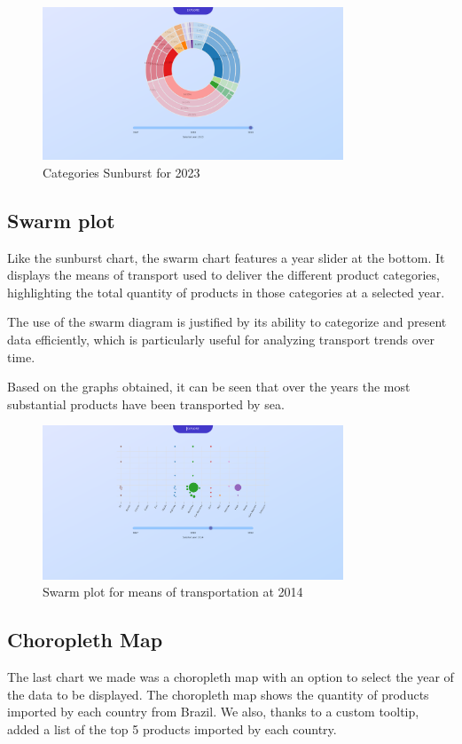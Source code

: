 \documentclass[12pt,a4]{article}
\begin{document}
\begin{figure}[H]
    \centering
    \includegraphics[width=0.8\textwidth]{sunburst.png}
    \caption{Categories Sunburst for 2023}
\end{figure}

\subsection{Swarm plot}
Like the sunburst chart, the swarm chart features a year slider at the bottom. It displays the means of transport used to deliver the different product categories, highlighting the total quantity of products in those categories at a selected year.

The use of the swarm diagram is justified by its ability to categorize and present data efficiently, which is particularly useful for analyzing transport trends over time.

Based on the graphs obtained, it can be seen that over the years the most substantial products have been transported by sea.

\begin{figure}[H]
    \centering
    \includegraphics[width=0.8\textwidth]{swarm.png}
    \caption{Swarm plot for means of transportation at 2014}
\end{figure}
\subsection{Choropleth Map}
The last chart we made was a choropleth map with an option to select the year of the data to be displayed. The choropleth map shows the quantity of products imported by each country from Brazil. We also, thanks to a custom tooltip, added a list of the top 5 products imported by each country.
\end{document}
